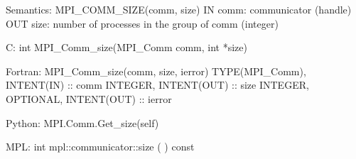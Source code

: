 Semantics:
MPI_COMM_SIZE(comm, size)
IN comm: communicator (handle)
OUT size: number of processes in the group of comm (integer)

C:
int MPI_Comm_size(MPI_Comm comm, int *size)

Fortran:
MPI_Comm_size(comm, size, ierror)
TYPE(MPI_Comm), INTENT(IN) :: comm
INTEGER, INTENT(OUT) :: size
INTEGER, OPTIONAL, INTENT(OUT) :: ierror

Python:
MPI.Comm.Get_size(self)

MPL:
int mpl::communicator::size ( ) const
